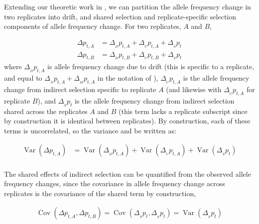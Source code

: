\documentclass[11pt]{article}
\newcommand{\vb}[1]{{\it \color{blue} #1}}
\DeclareMathOperator{\var}{Var}
\DeclareMathOperator{\cov}{Cov}
\providecommand{\DIFdelbegin}{} %
\begin{document}
Extending our theoretic work in \textcite{Buffalo2019-io}, we can partition the
allele frequency change in two replicates into drift, and shared selection and
replicate-specific selection components of allele frequency change. For two
replicates, $A$ and $B$, 

\begin{align}
  \Delta p_{t,A} &= \Delta_{_D} p_{t,A} + \Delta_{_{U}} p_{t,A} + \Delta_{_S} p_t \\
  \Delta p_{t,B} &= \Delta_{_D} p_{t,B} + \Delta_{_{U}} p_{t,B} + \Delta_{_S} p_t
\end{align}
%
where $\Delta_{_D} p_{t,A}$ is allele frequency change due to drift (this is
specific to a replicate, and equal to $\Delta_{_N} p_{t,A} + \Delta_{_M}
p_{t,A}$ in the notation of \cite{Buffalo2019-io}), $\Delta_{_{U}} p_{t,A}$ is
the allele frequency change from indirect selection specific to replicate $A$
(and likewise with $\Delta_{_{U}} p_{t,A}$ for replicate $B$), and $\Delta_{_S}
p_t$ is the allele frequency change from indirect selection shared across the
replicates $A$ and $B$ (this term lacks a replicate subscript since by
construction it is identical between replicates). By construction, each of
these terms is uncorrelated, so the variance and be written as:

\begin{align}
  \var(\Delta p_{t,A}) &= \var(\Delta_{_D} p_{t,A}) + \var(\Delta_{_{U}} p_{t,A}) + \var(\Delta_{_S} p_t) \\
\end{align}

The shared effects of indirect selection can be quantified from the observed
allele frequency changes, since the covariance in allele frequency change
across replicates is the covariance of the shared term by construction, 

\begin{align}
  \cov(\Delta p_{t,A}, \Delta p_{t,B}) = \cov(\Delta_{_S} p_{t}, \Delta_{_S} p_{t}) = \var(\Delta_{_S} p_{t})
\end{align}

\DIFdelbegin %
\end{document}

